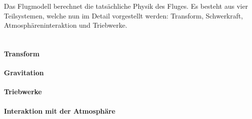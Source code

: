 Das Flugmodell berechnet die tatsächliche Physik des Fluges. Es besteht aus vier Teilsystemen, welche nun im Detail vor\-ge\-stellt werden: Transform, Schwerkraft, Atmosphäreninteraktion und Triebwerke. \\ \\

\paragraph{Transform}


\paragraph{Gravitation}


\paragraph{Triebwerke}


\paragraph{Interaktion mit der Atmosphäre}
